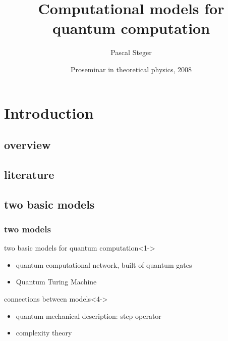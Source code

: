 \documentclass{beamer}
\title{Computational models for\\ quantum computation}
\author{Pascal Steger}
\date[10. 03. 2008]{Proseminar in theoretical physics, 2008}
\begin{document}
%
\begin{frame}
    \titlepage
\end{frame}
%
%
\section{Introduction}
%
\subsection{overview}
\begin{frame}
    \tableofcontents
\end{frame}
%
\subsection{literature}
\begin{frame}
    
    
	\hfill\vfill
	\cite{benioff1998}
	\cite{deutsch1985}
	\cite{deutsch1989}
	\cite{yao1993}
\end{frame}
%
\subsection{two basic models}
\begin{frame}
	\frametitle{two models}
    \begin{block}{two basic models for quantum computation}<1->
	    \begin{itemize}
    	    \item<2-> quantum computational network, built of quantum gates
        	\item<3-> Quantum Turing Machine
    	\end{itemize}
	\end{block}
	\begin{block}{connections between models}<4->
		\begin{itemize}
			\item<5-> quantum mechanical description: step operator
			\item<6-> complexity theory
		\end{itemize}
	\end{block}
\end{frame}
%
\begin{frame}
	\tableofcontents
\end{frame}
%
%
\end{document}
